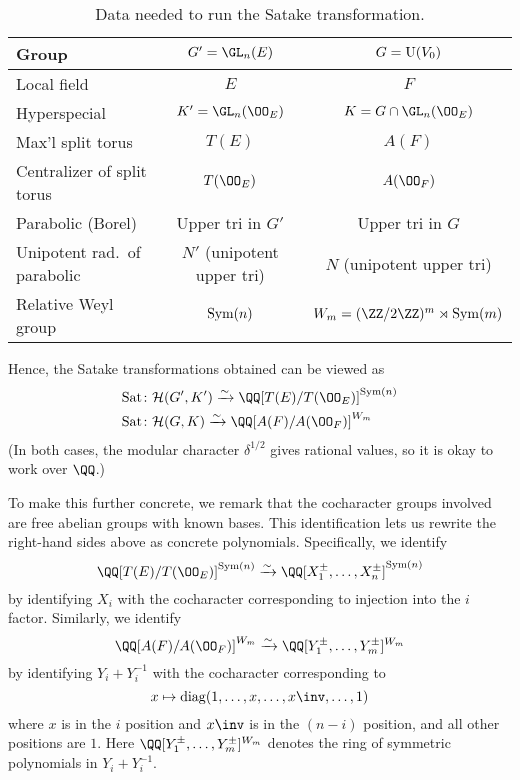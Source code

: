 \begin{table}
  \centering
  \begin{tabular}{lcc}
    Group & $G' = \GL_n(E)$ & $G = \operatorname{U}(V_0)$ \\ \hline
    Local field & $E$ & $F$ \\
    Hyperspecial & $K' = \GL_n(\OO_E)$ & $K = G \cap \GL_n(\OO_E)$ \\
    Max'l split torus & $T(E)$ & $A(F)$ \\
    Centralizer of split torus & $T(\OO_E)$ & $A(\OO_F)$ \\
    Parabolic (Borel) & Upper tri in $G'$ & Upper tri in $G$ \\
    Unipotent rad.\ of parabolic & $N'$ (unipotent upper tri) & $N$ (unipotent upper tri)  \\
    Relative Weyl group & $\operatorname{Sym}(n)$ & $W_m = (\ZZ/2\ZZ)^m \rtimes \Sym(m)$ \\
  \end{tabular}
  \caption{Data needed to run the Satake transformation.}
  \label{tab:satakestuff}
\end{table}

Hence, the Satake transformations obtained can be viewed as
\begin{align*}
  \Sat &\colon \HH(G', K') \xrightarrow{\sim} \QQ[T(E) / T(\OO_E)]^{\Sym(n)} \\
  \Sat &\colon \HH(G, K)\xrightarrow{\sim} \QQ[A(F) / A(\OO_F)]^{W_m}
\end{align*}
(In both cases, the modular character $\delta^{1/2}$ gives rational values,
so it is okay to work over $\QQ$.)

To make this further concrete, we remark that the cocharacter groups
involved are free abelian groups with known bases.
This identification lets us rewrite the right-hand sides above as concrete polynomials.
Specifically, we identify
\[ \QQ[T(E) / T(\OO_E)]^{\Sym(n)}
  \xrightarrow{\sim} \QQ[X_1^\pm, \dots, X_n^\pm]^{\Sym(n)} \]
by identifying $X_i$ with the
cocharacter corresponding to injection into the $i$ factor.
Similarly, we identify
\[ \QQ[A(F) / A(\OO_F)]^{W_m}
  \xrightarrow{\sim} \QQ[Y_1^{\pm}, \dots, Y_m^{\pm}]^{W_m} \]
by identifying $Y_i + Y_i^{-1}$
with the cocharacter corresponding to
\[ x \mapsto \diag(1, \dots, x, \dots, x\inv, \dots, 1) \]
where $x$ is in the $i$ position and $x\inv$ is in the $(n-i)$ position,
and all other positions are $1$.
Here $\QQ[Y_1^{\pm}, \dots, Y_m^{\pm}]^{W_m}$
denotes the ring of symmetric polynomials in $Y_i + Y_i^{-1}$.

